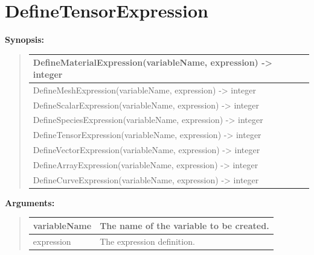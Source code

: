 \documentclass[letterpaper,10pt,english]{sphinxmanual}
\begin{document}
\section{DefineTensorExpression}
\label{functions:definetensorexpression}
\begin{DUlineblock}{0em}
\item[] \textbf{Synopsis:}
\end{DUlineblock}
\begin{quote}

\begin{tabulary}{\linewidth}{|L|}
\hline

DefineMaterialExpression(variableName, expression) -\textgreater{} integer
\\
\hline
DefineMeshExpression(variableName, expression) -\textgreater{} integer
\\
\hline
DefineScalarExpression(variableName, expression) -\textgreater{} integer
\\
\hline
DefineSpeciesExpression(variableName, expression) -\textgreater{} integer
\\
\hline
DefineTensorExpression(variableName, expression) -\textgreater{} integer
\\
\hline
DefineVectorExpression(variableName, expression) -\textgreater{} integer
\\
\hline
DefineArrayExpression(variableName, expression) -\textgreater{} integer
\\
\hline
DefineCurveExpression(variableName, expression) -\textgreater{} integer
\\
\hline\end{tabulary}

\end{quote}

\begin{DUlineblock}{0em}
\item[] 
\item[] \textbf{Arguments:}
\end{DUlineblock}
\begin{quote}

\begin{tabulary}{\linewidth}{|L|L|}
\hline

variableName
 & 
The name of the variable to be created.
\\
\hline
expression
 & 
The expression definition.
\\
\hline\end{tabulary}

\end{quote}
\end{document}
